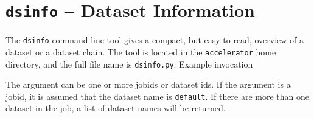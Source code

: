 
\section{\texttt{dsinfo} -- Dataset Information}
The \texttt{dsinfo} command line tool gives a compact, but easy to
read, overview of a dataset or a dataset chain.  The tool is located
in the \texttt{accelerator} home directory, and the full file name is
\texttt{dsinfo.py}.  Example invocation
\begin{shell}
\end{shell}
The argument can be one or more jobids or dataset ids.  If the
argument is a jobid, it is assumed that the dataset name is
\texttt{default}.  If there are more than one dataset in the job, a
list of dataset names will be returned.
